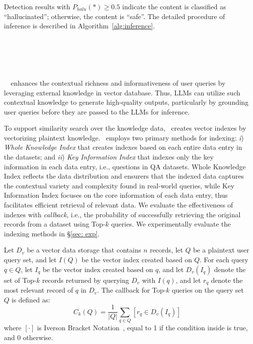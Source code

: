 Detection results with $P_{\mathit{halu}}(*)\geq0.5$ indicate the content is classified as ``hallucinated''; otherwise, the content is ``safe''.  The detailed procedure of  inference is described in Algorithm~\ref{alg:inference}.


\section{\goodname~\grounding}\label{sec:grounding}






\goodname~\grounding~enhances the contextual richness and informativeness of user queries by leveraging external knowledge in vector database. Thus, LLMs can utilize such contextual knowledge to generate high-quality outputs, particularly by grounding user queries before they are passed to the LLMs for inference.

To support similarity search over the knowledge data, \goodname~creates vector indexes by vectorizing plaintext knowledge.%
\goodname~employs two primary methods for indexing: \textit{i}) \textit{{Whole Knowledge Index}} that creates indexes based on each entire data entry in the datasets; and \textit{ii}) \textit{{Key Information Index}} that indexes only the key information in each data entry, i.e., questions in QA datasets. 
Whole Knowledge Index reflects the data distribution and ensurers that the indexed data captures the contextual variety and complexity found in real-world queries, while Key Information Index 
focuses on the core information of each data entry, thus facilitates efficient retrieval of relevant data. 
We evaluate the effectiveness of indexes with \textit{callback}, i.e., the probability of successfully retrieving the original records from a dataset using Top-$k$ queries. 
We experimentally evaluate the indexing methods in \S\ref{sec: exp}.


\begin{definition}[Callback]
    Let $D_v$ be a vector data storage that contains $n$ records, let $Q$ be a plaintext user query set, and let $I(Q)$ be the vector index created based on $Q$. For each query $q\in Q$, let $I_q$ be the vector index created based on $q$, and let $D_v(I_q)$ denote the set of Top-$k$ records returned by querying $D_v$ with $I(q)$, and let $r_q$ denote the most relevant record of $q$ in $D_v$. 
    The callback for Top-$k$ queries on the query set $Q$ is defined as:
$$C_k(Q) = \frac{1}{|Q|} \sum_{q \in Q} [r_q \in D_v(I_q)]$$
where $[\cdot]$ is Iverson Bracket Notation~\citep{iverson1962programming}, equal to 1 if the condition inside is true, and 0 otherwise.
\end{definition}

